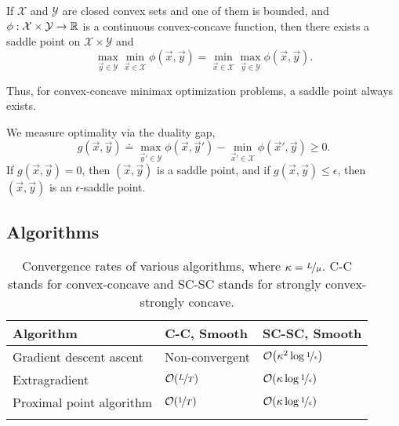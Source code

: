 \begin{theorem}
    If $\mathcal{X}$ and $\mathcal{Y}$ are closed convex sets and one of them is bounded, and $\phi: \mathcal{X} \times \mathcal{Y} \to \mathbb{R}$ is a continuous convex-concave function, then there exists a saddle point on $\mathcal{X} \times \mathcal{Y}$ and \[
        \max_{\vec{y} \in \mathcal{Y}} \min_{\vec{x} \in \mathcal{X}} \phi(\vec{x}, \vec{y}) = \min_{\vec{x} \in \mathcal{X}} \max_{\vec{y} \in \mathcal{Y}} \phi(\vec{x}, \vec{y}).
    \]
\end{theorem}

Thus, for convex-concave minimax optimization problems, a saddle point always exists.

We measure optimality via the duality gap, \[
    g(\vec{x}, \vec{y}) \doteq \max_{\vec{y}' \in \mathcal{Y}} \phi(\vec{x}, \vec{y}') - \min_{\vec{x}' \in \mathcal{X}} \phi(\vec{x}', \vec{y}) \geq 0.
\]
If $g(\vec{x}, \vec{y}) = 0$, then $(\vec{x}, \vec{y})$ is a saddle point, and if $g(\vec{x},
    \vec{y}) \leq \epsilon$, then $(\vec{x}, \vec{y})$ is an $\epsilon$-saddle point.

\subsection{Algorithms}

\begin{table}[t]
    \centering
    \caption{Convergence rates of various algorithms, where $\kappa = \nicefrac{L}{\mu}$. C-C stands for convex-concave and SC-SC stands for strongly convex-strongly concave.}
    \label{tab:mmo}
    \begin{tabular}{lll} \toprule
        \textbf{Algorithm}       & \textbf{C-C, Smooth}     & \textbf{SC-SC, Smooth}                        \\
        \midrule
        Gradient descent ascent  & Non-convergent           & $\bigo{\kappa^2 \log \nicefrac{1}{\epsilon}}$ \\
        Extragradient            & $\bigo{\nicefrac{L}{T}}$ & $\bigo{\kappa \log \nicefrac{1}{\epsilon}}$   \\
        Proximal point algorithm & $\bigo{\nicefrac{1}{T}}$ & $\bigo{\kappa \log \nicefrac{1}{\epsilon}}$   \\
        \bottomrule                                                                                         \\
    \end{tabular}
\end{table}

